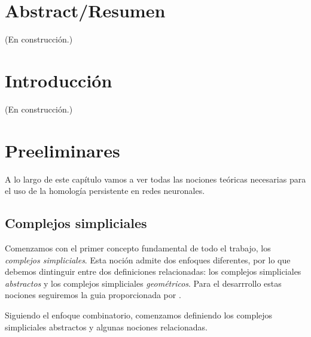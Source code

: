 \documentclass[12pt, a4paper, twoside]{book}
\numberwithin{equation}{section}
\theoremstyle{definition}
\theoremstyle{remark}
\theoremstyle{plain}
\begin{document}
	\pagestyle{main}

	
	
	\chapter*{Abstract/Resumen}
	(En construcción.)

	
	\newpage

	\tableofcontents

	\newpage

	
	\chapter{Introducción}
	(En construcción.)

	\newpage

	\chapter{Preeliminares}

	A lo largo de este capítulo vamos a ver todas las nociones teóricas 
	necesarias para el uso de la homología persistente en redes neuronales.	
	
	\section{Complejos simpliciales}
	Comenzamos con el primer concepto fundamental de todo el trabajo, los 
	\emph{complejos simpliciales}. Esta noción admite dos enfoques 
	diferentes, por lo que debemos dintinguir entre dos definiciones 
	relacionadas: los complejos simpliciales \emph{abstractos} y los 
	complejos simpliciales \emph{geométricos}. Para el desarrrollo estas 
	nociones seguiremos la guia proporcionada por 
	\cite{TopoAlg-Edelsbrunner,Intro-Otter}.

	Siguiendo el enfoque combinatorio, comenzamos definiendo los complejos 
	simpliciales abstractos y algunas nociones relacionadas. 
\end{document}
